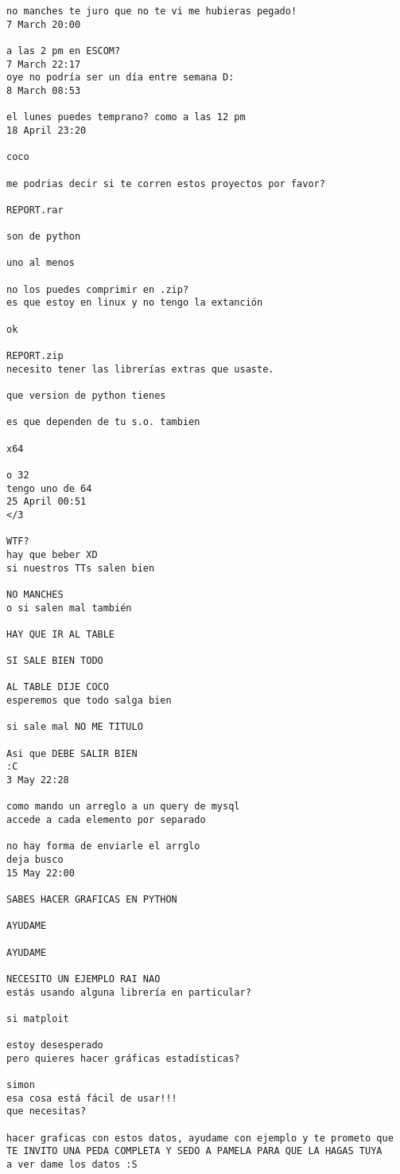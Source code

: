 \begin{verbatim}
no manches te juro que no te vi me hubieras pegado!
7 March 20:00

a las 2 pm en ESCOM?
7 March 22:17
oye no podría ser un día entre semana D:
8 March 08:53

el lunes puedes temprano? como a las 12 pm
18 April 23:20

coco

me podrias decir si te corren estos proyectos por favor?

REPORT.rar

son de python

uno al menos

no los puedes comprimir en .zip?
es que estoy en linux y no tengo la extanción 

ok

REPORT.zip
necesito tener las librerías extras que usaste.

que version de python tienes

es que dependen de tu s.o. tambien

x64

o 32
tengo uno de 64
25 April 00:51
</3

WTF?
hay que beber XD
si nuestros TTs salen bien

NO MANCHES
o si salen mal también

HAY QUE IR AL TABLE

SI SALE BIEN TODO

AL TABLE DIJE COCO
esperemos que todo salga bien

si sale mal NO ME TITULO

Asi que DEBE SALIR BIEN
:C
3 May 22:28

como mando un arreglo a un query de mysql
accede a cada elemento por separado

no hay forma de enviarle el arrglo
deja busco
15 May 22:00

SABES HACER GRAFICAS EN PYTHON

AYUDAME

AYUDAME

NECESITO UN EJEMPLO RAI NAO
estás usando alguna librería en particular?

si matploit

estoy desesperado 
pero quieres hacer gráficas estadísticas?

simon
esa cosa está fácil de usar!!!
que necesitas?

hacer graficas con estos datos, ayudame con ejemplo y te prometo que TE INVITO UNA PEDA COMPLETA Y SEDO A PAMELA PARA QUE LA HAGAS TUYA
a ver dame los datos :S


\end{verbatim}
